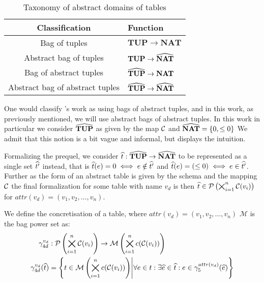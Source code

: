 \begin{table}
    \caption{Taxonomy of abstract domains of tables}
    \centering
    \begin{tabular}{c|l}
    Classification & Function \\
    \hline
    \hline
        Bag of tuples & $\mathbf{TUP} \rightarrow \mathbf{NAT}$ \\
        Abstract bag of tuples & $\mathbf{TUP} \rightarrow \widehat{\mathbf{NAT}}$ \\
        Bag of abstract tuples & $\widehat{\mathbf{TUP}} \rightarrow \mathbf{NAT}$ \\
        Abstract bag of abstract tuples & $\widehat{\mathbf{TUP}} \rightarrow \widehat{\mathbf{NAT}}$ \\
    \end{tabular}
    \label{tab:taxonomy_of_abstract_domain_of_tables}
\end{table}

One would classify \cite{halder_abstract_2012}'s work as using bags of abstract tuples, and in this work, as previously mentioned, we will use abstract bags of abstract tuples.
In this work in particular we consider $\widehat{\mathbf{TUP}}$ as given by the map $\mathcal{C}$ and $\widehat{\mathbf{NAT}} = \{0, \leq0\}$
We admit that this notion is a bit vague and informal, but displays the intuition.

Formalizing the prequel, we consider $\widehat{t} : \widehat{\mathbf{TUP}} \rightarrow \widehat{\mathbf{NAT}}$ to be represented as a single set $\widehat{t'}$ instead, that is $\widehat{t}({e}) = 0 \iff e \notin \widehat{t'}$ and  $\widehat{t}({e}) = (\leq 0) \iff e \in \widehat{t'}$.
Further as the form of an abstract table is given by the schema and the mapping $\mathcal{C}$ the final formalization for some table with name $v_d$ is then $\widehat{t} \in \mathcal{P}\left(\bigtimes_{i = 1}^{n}\mathcal{C}(v_i)\right)$ for $attr(v_d) = (v_1, v_2, \dots, v_n)$.

We define the concretisation of a table, where $attr(v_d) = (v_1, v_2, \dots, v_n)$ $\mathcal{M}$ is the bag power set as:
\begin{align}
    \gamma^{v_d}_{4d} &: \mathcal{P}\left(\bigtimes_{i = 1}^{n}\mathcal{C}(v_i)\right) \rightarrow \mathcal{M}\left(\bigtimes_{i = 1}^n c(\mathcal{C}(v_i))\right) \\
    \gamma^{v_d}_{4d}(\widehat{t}) &= \left\{ t \in \mathcal{M}\left(\bigtimes_{i = 1}^n c(\mathcal{C}(v_i))\right) \middle|\forall e \in t : \exists \widehat{e} \in \widehat{t} : e \in \gamma^{attr(v_d)}_5(\widehat{e}) \right\}
\end{align}

